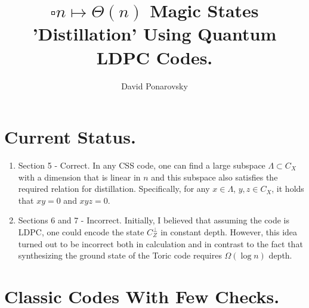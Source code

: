 \documentclass[manuscript,screen,review]{acmart}
\begin{document}

\title{ $\square{n} \mapsto \Theta(n)$  Magic States 'Distillation' Using
Quantum LDPC Codes. }
\author{David Ponarovsky}
\maketitle

\section{Current Status.}

\begin{enumerate}
  \item Section 5 - Correct. In any CSS code, one can find a large subspace
    $\Lambda \subset C_{X}$ with a dimension that is linear in $n$ and this
    subspace also satisfies the required relation for distillation.
    Specifically,
    for any $x \in \Lambda$, $y, z \in C_{X}$, it holds that $xy = 0$ and $xyz =
    0$.
  \item Sections 6 and 7 - Incorrect. Initially, I believed that assuming the
    code is LDPC, one could encode the state $C_{Z}^{\perp}$ in constant depth.
    However, this idea turned out to be incorrect both in calculation and in
    contrast to the fact that synthesizing the ground state of the Toric code
    requires $\Omega(\log n)$ depth.
\end{enumerate}

\section{Classic Codes With Few Checks.}
\end{document}
